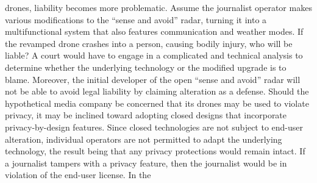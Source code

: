drones, liability becomes more problematic. Assume the journalist operator
makes various modifications to the ``sense and avoid'' radar, turning it into
a multifunctional system that also features communication and weather
modes. If the revamped drone crashes into a person, causing bodily injury,
who will be liable? A court would have to engage in a complicated and technical
analysis to determine whether the underlying technology or the modified
upgrade is to blame. Moreover, the initial developer of the open ``sense
and avoid'' radar will not be able to avoid legal liability by claiming alteration
as a defense.
Should the hypothetical media company be concerned that its drones may
be used to violate privacy, it may be inclined toward adopting closed designs
that incorporate privacy-by-design features. Since closed technologies are
not subject to end-user alteration, individual operators are not permitted to
adapt the underlying technology, the result being that any privacy protections
would remain intact. If a journalist tampers with a privacy feature,
then the journalist would be in violation of the end-user license. In the

